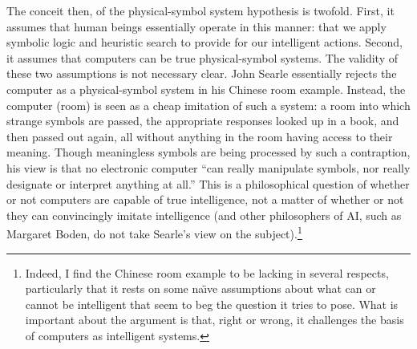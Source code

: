 The conceit then, of the physical-symbol system hypothesis is twofold.
First, it assumes that
human beings essentially operate in this manner: that we apply
symbolic logic and heuristic search to provide for our intelligent
actions. Second, it assumes that computers can be true physical-symbol
systems. The validity of these two assumptions is not necessary clear. John Searle
essentially rejects the computer as a physical-symbol system in his
Chinese room example. Instead, the computer (room) is seen as a cheap
imitation of such a system: a room into which strange symbols are
passed, the appropriate responses looked up in a book,
and then passed out again, all without anything in the room having
access to their meaning.\cite{chineseSearle} Though meaningless
symbols are being processed by such a contraption, his view is that no
electronic computer ``can really manipulate symbols, nor really
designate or interpret anything at all.''\cite{escapingBoden} This is
a philosophical question of whether or not computers are capable of
true intelligence, not a matter of whether or not they can
convincingly imitate intelligence (and other philosophers of AI, such
as Margaret Boden, do not take Searle's view on the
subject).\footnote{Indeed, I find the Chinese room example to be
  lacking in several respects, particularly that it rests on some
  na\"{\i}ve assumptions about what can or cannot be intelligent that seem to beg
  the question it tries to pose. What is important about the
  argument is that, right or wrong, it challenges the basis of
  computers as intelligent systems.}

